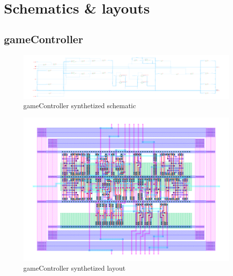 \documentclass[]{article}
\begin{document}
\appendix
\section{Schematics \& layouts}

\subsection{gameController}
\begin{figure}[H]
\centering
\includegraphics[width=.9\textwidth]{gameController-schematic}
\caption{gameController synthetized schematic}
\label{fig:gameController-schematic}
\end{figure}

\begin{figure}[H]
\centering
\includegraphics[width=.9\textwidth]{gameController-layout}
\caption{gameController synthetized layout}
\label{fig:gameController-layout}
\end{figure}

\end{document}
